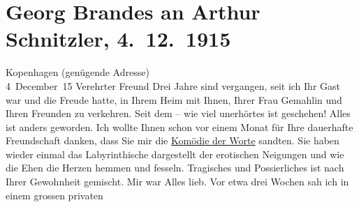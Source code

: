 

               \section[Georg Brandes an Arthur Schnitzler, 4. 12. 1915]{ Georg Brandes an Arthur Schnitzler, 4. 12. 1915}\nopagebreak{}\rehead{ }\begin{ledgroupsized}[t]{13cm}\normalsize\beginnumbering{} \toendnotes[C]{\smallbreak\pagebreak[2]} 
\toendnotes[C]{\smallbreak}\pstart
           \raggedleft{}{\pb}Kopenhagen (genügende Adresse){\\}4 December 15\pend
           \pstart{}Verehrter Freund\pend\pstart
           Drei Jahre sind vergangen, seit ich Ihr Gast war und die Freude hatte, in Ihrem
                    Heim mit Ihnen, Ihrer Frau Gemahlin und Ihren Freunden zu verkehren. Seit dem – wie viel
                    unerhörtes ist geschehen! Alles ist anders geworden.\pend
           \pstart
           Ich wollte Ihnen schon vor einem Monat für Ihre dauerhafte Freundschaft danken,
                    dass Sie mir die \uline{Komödie der Worte}
               sandten. Sie haben wieder einmal das Labyrinthische dargestellt der
                    erotischen Neigungen und wie die Ehen die Herzen hemmen und fesseln. Tragisches
                    und Possierliches ist nach Ihrer Gewohnheit gemischt. Mir war Alles lieb.\pend
           \pstart
           Vor etwa drei Wochen sah ich in {\pb}einem grossen privaten

\end{ledgroupsized}
